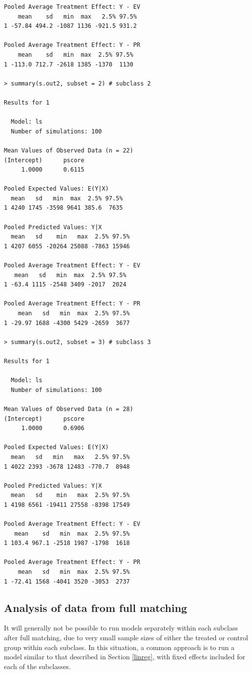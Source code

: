 \documentclass[oneside,letterpaper,titlepage]{article}
\begin{document}
\begin{verbatim}
Pooled Average Treatment Effect: Y - EV
    mean    sd   min  max   2.5% 97.5%
1 -57.84 494.2 -1087 1136 -921.5 931.2

Pooled Average Treatment Effect: Y - PR
    mean    sd   min  max  2.5% 97.5%
1 -113.0 712.7 -2618 1385 -1370  1130

> summary(s.out2, subset = 2) # subclass 2

Results for 1 

  Model: ls 
  Number of simulations: 100 

Mean Values of Observed Data (n = 22) 
(Intercept)      pscore 
     1.0000      0.6115 

Pooled Expected Values: E(Y|X)
  mean   sd   min  max  2.5% 97.5%
1 4240 1745 -3598 9641 385.6  7635

Pooled Predicted Values: Y|X
  mean   sd    min   max  2.5% 97.5%
1 4207 6055 -20264 25088 -7863 15946

Pooled Average Treatment Effect: Y - EV
   mean   sd   min  max  2.5% 97.5%
1 -63.4 1115 -2548 3409 -2017  2024

Pooled Average Treatment Effect: Y - PR
    mean   sd   min  max  2.5% 97.5%
1 -29.97 1688 -4300 5429 -2659  3677

> summary(s.out2, subset = 3) # subclass 3

Results for 1 

  Model: ls 
  Number of simulations: 100 

Mean Values of Observed Data (n = 28) 
(Intercept)      pscore 
     1.0000      0.6906 

Pooled Expected Values: E(Y|X)
  mean   sd   min   max   2.5% 97.5%
1 4022 2393 -3678 12483 -770.7  8948

Pooled Predicted Values: Y|X
  mean   sd    min   max  2.5% 97.5%
1 4198 6561 -19411 27558 -8398 17549

Pooled Average Treatment Effect: Y - EV
   mean    sd   min  max  2.5% 97.5%
1 103.4 967.1 -2518 1987 -1798  1618

Pooled Average Treatment Effect: Y - PR
    mean   sd   min  max  2.5% 97.5%
1 -72.41 1568 -4041 3520 -3053  2737

\end{verbatim}

\subsection{Analysis of data from full matching}
It will generally not be possible to run models
separately within each subclass after full matching, due to very small sample sizes of either the treated or
control group within each subclass.  In this situation, a common approach is to run a model similar to that 
described in Section \ref{linreg}, with fixed effects included for each of the subclasses. 
\end{document}
